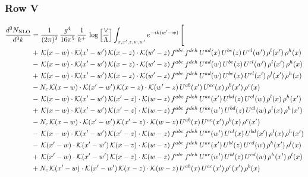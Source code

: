 \documentclass[9pt]{article}
\numberwithin{equation}{section}
\begin{document}
\subsubsection{Row V}
\begin{align}
\frac{d^{3}N_{\mathrm{NLO}}}{d^{3}k} & = \frac{1}{(2\pi)^{3}}\,\frac{g^{4}}{16\pi^{5}}\,\frac{1}{k^{+}}\,\log\Big[\frac{\vee}{\Lambda}\Big]\int_{x,x',z,w,w'}e^{-ik(w'-w)}\,\Bigg[\notag\\ &  +\,\mathcal{K}(x-w)\cdot\mathcal{K}(x'-w')\,\mathcal{K}(x-z)\cdot\mathcal{K}(w'-z)\,f^{abc}\,f^{deh}\,U^{ad}(x)\,U^{be}(z)\,U^{cl}(w')\,\rho^{l}(x')\,\rho^{h}(x)\notag\\
& -\,\mathcal{K}(x-w)\cdot\mathcal{K}(x'-w')\,\mathcal{K}(x-z)\cdot\mathcal{K}(w'-z)\,f^{abc}\,f^{deh}\,U^{ad}(w)\,U^{be}(z)\,U^{cl}(w')\,\rho^{l}(x')\,\rho^{h}(x)\notag\\
& +\,\mathcal{K}(x-w)\cdot\mathcal{K}(x'-w')\,\mathcal{K}(x-z)\cdot\mathcal{K}(w'-z)\,f^{abc}\,f^{deh}\,U^{ad}(w)\,U^{be}(x)\,U^{cl}(x')\,\rho^{l}(x')\,\rho^{h}(x)\notag\\
& -N_{c}\,\mathcal{K}(x-w)\cdot\mathcal{K}(x'-w')\,\mathcal{K}(x-z)\cdot\mathcal{K}(w'-z)\,U^{ab}(x')\,U^{ac}(x)\,\rho^{b}(x')\,\rho^{c}(x)\notag\\
& -\,\mathcal{K}(x-w)\cdot\mathcal{K}(x'-w')\,\mathcal{K}(x'-z)\cdot\mathcal{K}(w-z)\,f^{abc}\,f^{deh}\,U^{ae}(x')\,U^{bd}(z)\,U^{cl}(w)\,\rho^{l}(x)\,\rho^{h}(x')\notag\\
& +\,\mathcal{K}(x-w)\cdot\mathcal{K}(x'-w')\,\mathcal{K}(x'-z)\cdot\mathcal{K}(w-z)\,f^{abc}\,f^{deh}\,U^{ae}(w')\,U^{bd}(z)\,U^{cl}(w)\,\rho^{l}(x)\,\rho^{h}(x')\notag\\
& -N_{c}\,\mathcal{K}(x-w)\cdot\mathcal{K}(x'-w')\,\mathcal{K}(x'-z)\cdot\mathcal{K}(w-z)\,U^{ab}(x)\,U^{ac}(x')\,\rho^{b}(x)\,\rho^{c}(x')\notag\\
& -\,\mathcal{K}(x-w)\cdot\mathcal{K}(x'-w')\,\mathcal{K}(x'-z)\cdot\mathcal{K}(w-z)\,f^{abc}\,f^{deh}\,U^{ae}(w')\,U^{cl}(x)\,U^{bd}(x')\,\rho^{l}(x)\,\rho^{h}(x')\notag\\
& -\,\mathcal{K}(x'-w)\cdot\mathcal{K}(x'-w')\,\mathcal{K}(x-z)\cdot\mathcal{K}(w-z)\,f^{abc}\,f^{deh}\,U^{ae}(x')\,U^{bl}(z)\,U^{cd}(w)\,\rho^{h}(x')\,\rho^{l}(x)\notag\\
& +\,\mathcal{K}(x'-w)\cdot\mathcal{K}(x'-w')\,\mathcal{K}(x-z)\cdot\mathcal{K}(w-z)\,f^{abc}\,f^{deh}\,U^{ae}(w')\,U^{bl}(z)\,U^{cd}(w)\,\rho^{h}(x')\,\rho^{l}(x)\notag\\
& +N_{c}\,\mathcal{K}(x'-w)\cdot\mathcal{K}(x'-w')\,\mathcal{K}(x-z)\cdot\mathcal{K}(w-z)\,U^{ab}(x)\,U^{ac}(x')\,\rho^{c}(x')\,\rho^{b}(x)\notag\\

\end{align}
\end{document}
